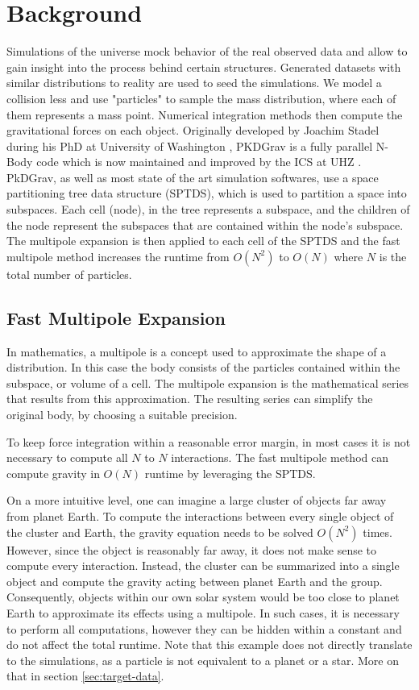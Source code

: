 \documentclass[]{article}
\begin{document}
\newpage
\section{Background}

Simulations of the universe mock behavior of the real observed data and allow to gain insight into the process behind certain structures\cite{Stadel2001}. Generated datasets with similar distributions to reality are used to seed the simulations. We model a collision less and use "particles" to sample the mass distribution, where each of them represents a mass point. Numerical integration methods then compute the gravitational forces on each object.
Originally developed by Joachim Stadel during his PhD at University of Washington \cite{Stadel2001}, PKDGrav is a fully parallel N-Body code which is now maintained and improved by the ICS at UHZ \cite{ICS}. 
PkDGrav, as well as most state of the art simulation softwares, use a space partitioning tree data structure (SPTDS), which is used to partition a space into subspaces. Each cell (node), in the tree represents a subspace, and the children of the node represent the subspaces that are contained within the node's subspace. The multipole expansion is then applied to each cell of the SPTDS and the fast multipole method increases the runtime from $O(N^2)$ to $O(N)$ where $N$ is the total number of particles. \cite{Stadel2001}


\subsection{Fast Multipole Expansion} \label{sec:multipole}

In mathematics, a multipole is a concept used to approximate the shape of a distribution. In this case the body consists of the particles contained within the subspace, or volume of a cell. The multipole expansion is the mathematical series that results from this approximation. The resulting series can simplify the original body, by choosing a suitable precision.

To keep force integration within a reasonable error margin, in most cases it is not necessary to compute all $N$ to $N$ interactions. The fast multipole method can compute gravity in $O(N)$ runtime by leveraging the SPTDS. \cite{Stadel2001}

On a more intuitive level, one can imagine a large cluster of objects far away from planet Earth. To compute the interactions between every single object of the cluster and Earth, the gravity equation needs to be solved $O(N^2)$ times. However, since the object is reasonably far away, it does not make sense to compute every interaction. Instead, the cluster can be summarized into a single object and compute the gravity acting between planet Earth and the group. Consequently, objects within our own solar system would be too close to planet Earth to approximate its effects using a multipole. In such cases, it is necessary to perform all computations, however they can be hidden within a constant and do not affect the total runtime. 
Note that this example does not directly translate to the simulations, as a particle is not equivalent to a planet or a star. More on that in section \ref{sec:target-data}.
\end{document}
